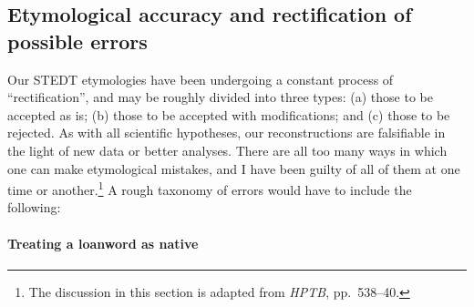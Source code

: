 


	
	
%



	
\subsection[Etymological accuracy and rectification of possible errors]{Etymological accuracy and rectification of possible errors}

Our STEDT etymologies have been undergoing a constant process of “rectification”, and may be roughly divided into three types: (a) those to be accepted as is; (b) those to be accepted with modifications; and (c) those to be rejected. 
As with all scientific hypotheses, our reconstructions are falsifiable in the light of new data or better analyses. 
There are all too many ways in which one can make etymological mistakes, and
I have been guilty of all of them at one time or another.\footnote{The discussion in this section is adapted from \textit{HPTB}, pp.~538–40.} 
A rough taxonomy of
errors would have to include the following:


\paragraph{Treating a loanword as native}

